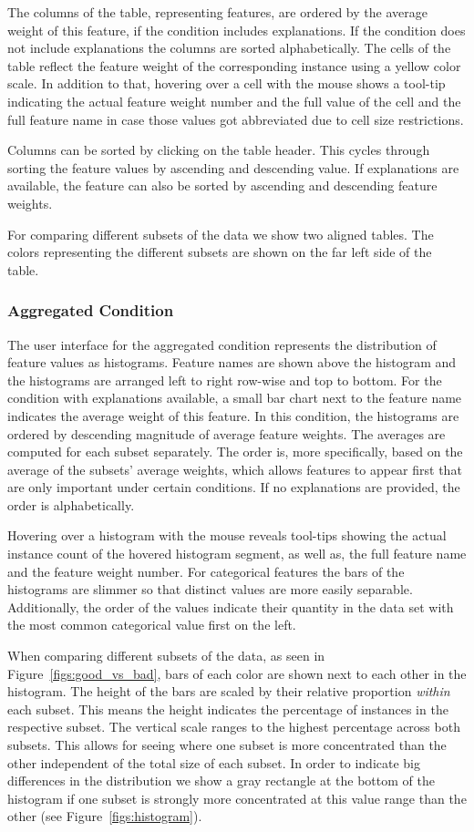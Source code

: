 The columns of the table, representing features, are ordered by the average weight of this feature, if the condition includes explanations.
If the condition does not include explanations the columns are sorted alphabetically.
The cells of the table reflect the feature weight of the corresponding instance using a yellow color scale.
In addition to that, hovering over a cell with the mouse shows a tool-tip indicating the actual feature weight number and the full value of the cell and the full feature name in case those values got abbreviated due to cell size restrictions.

Columns can be sorted by clicking on the table header.
This cycles through sorting the feature values by ascending and descending value.
If explanations are available, the feature can also be sorted by ascending and descending feature weights.

For comparing different subsets of the data we show two aligned tables.
The colors representing the different subsets are shown on the far left side of the table.

\subsubsection{Aggregated Condition}
The user interface for the aggregated condition represents the distribution of feature values as histograms.
Feature names are shown above the histogram and the histograms are arranged left to right row-wise and top to bottom.
For the condition with explanations available, a small bar chart next to the feature name indicates the average weight of this feature.
In this condition, the histograms are ordered by descending magnitude of average feature weights.
The averages are computed for each subset separately.
The order is, more specifically, based on the average of the subsets' average weights, which allows features to appear first that are only important under certain conditions.
If no explanations are provided, the order is alphabetically.

Hovering over a histogram with the mouse reveals tool-tips showing the actual instance count of the hovered histogram segment, as well as, the full feature name and the feature weight number.
For categorical features the bars of the histograms are slimmer so that distinct values are more easily separable.
Additionally, the order of the values indicate their quantity in the data set with the most common categorical value first on the left.

When comparing different subsets of the data, as seen in Figure~\ref{figs:good_vs_bad}, bars of each color are shown next to each other in the histogram.
The height of the bars are scaled by their relative proportion \emph{within} each subset.
This means the height indicates the percentage of instances in the respective subset.
The vertical scale ranges to the highest percentage across both subsets.
This allows for seeing where one subset is more concentrated than the other independent of the total size of each subset.
In order to indicate big differences in the distribution we show a gray rectangle at the bottom of the histogram if one subset is strongly more concentrated at this value range than the other (see Figure~\ref{figs:histogram}).

